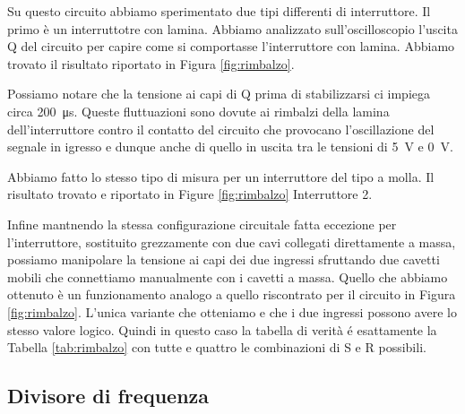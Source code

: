 Su questo circuito abbiamo sperimentato due tipi differenti di interruttore. Il primo è un interruttotre con lamina. Abbiamo analizzato sull'oscilloscopio l'uscita Q del circuito per capire come si comportasse l'interruttore con lamina. Abbiamo trovato il risultato riportato in Figura \ref{fig:rimbalzo}.

Possiamo notare che la tensione ai capi di Q prima di stabilizzarsi ci impiega circa \SI{200}{\micro\second}. Queste fluttuazioni sono dovute ai rimbalzi della lamina dell'interruttore contro il contatto del circuito che provocano l'oscillazione del segnale in igresso e dunque anche di quello in uscita tra le tensioni di \SI{+5}{\volt} e \SI{0}{\volt}.

Abbiamo fatto lo stesso tipo di misura per un interruttore del tipo a molla. Il risultato trovato e riportato in Figure \ref{fig:rimbalzo} Interruttore 2.

Infine mantnendo la stessa configurazione circuitale fatta eccezione per l'interruttore, sostituito grezzamente con due cavi collegati direttamente a massa, possiamo manipolare la tensione ai capi dei due ingressi sfruttando due cavetti mobili che connettiamo manualmente con i cavetti a massa.
Quello che abbiamo ottenuto è un funzionamento analogo a quello riscontrato per il circuito in Figura \ref{fig:rimbalzo}.
L'unica variante che otteniamo e che i due ingressi possono avere lo stesso valore logico. Quindi in questo caso la tabella di verità é esattamente la Tabella \ref{tab:rimbalzo} con tutte e quattro le combinazioni di S e R possibili.

\subsection*{Divisore di frequenza}

